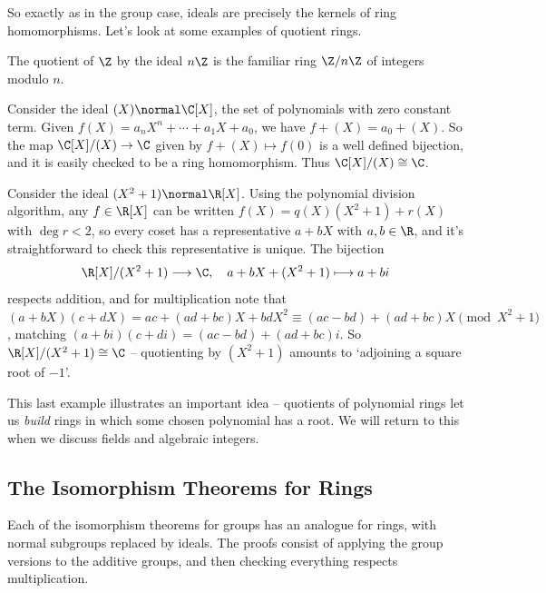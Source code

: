 So exactly as in the group case, ideals are precisely the kernels of ring homomorphisms. Let's look at some examples of quotient rings.

\begin{example}[Quotients of $\Z$]
	The quotient of $\Z$ by the ideal $n\Z$ is the familiar ring $\Z/n\Z$ of integers modulo $n$.
\end{example}

\begin{example}[{$\C[X]/(X)$}]
	Consider the ideal $(X) \normal \C[X]$, the set of polynomials with zero constant term. Given $f(X) = a_n X^n + \cdots + a_1 X + a_0$, we have $f + (X) = a_0 + (X)$. So the map $\C[X]/(X) \rightarrow \C$ given by $f + (X) \mapsto f(0)$ is a well defined bijection, and it is easily checked to be a ring homomorphism. Thus $\C[X]/(X) \cong \C$.
\end{example}

\begin{example}[{$\R[X]/(X^2 + 1)$}]
	Consider the ideal $(X^2 + 1) \normal \R[X]$. Using the polynomial division algorithm, any $f \in \R[X]$ can be written $f(X) = q(X)(X^2 + 1) + r(X)$ with $\deg r < 2$, so every coset has a representative $a + bX$ with $a, b \in \R$, and it's straightforward to check this representative is unique. The bijection
	$$
	\R[X]/(X^2 + 1) \longrightarrow \C, \quad a + bX + (X^2 + 1) \longmapsto a + bi
	$$
	respects addition, and for multiplication note that $(a + bX)(c + dX) = ac + (ad + bc)X + bdX^2 \equiv (ac - bd) + (ad + bc)X \pmod{X^2 + 1}$, matching $(a + bi)(c + di) = (ac - bd) + (ad + bc)i$. So $\R[X]/(X^2 + 1) \cong \C$ -- quotienting by $(X^2+1)$ amounts to `adjoining a square root of $-1$'.
\end{example}

This last example illustrates an important idea -- quotients of polynomial rings let us \emph{build} rings in which some chosen polynomial has a root. We will return to this when we discuss fields and algebraic integers.

\subsection{The Isomorphism Theorems for Rings}

Each of the isomorphism theorems for groups has an analogue for rings, with normal subgroups replaced by ideals. The proofs consist of applying the group versions to the additive groups, and then checking everything respects multiplication.

